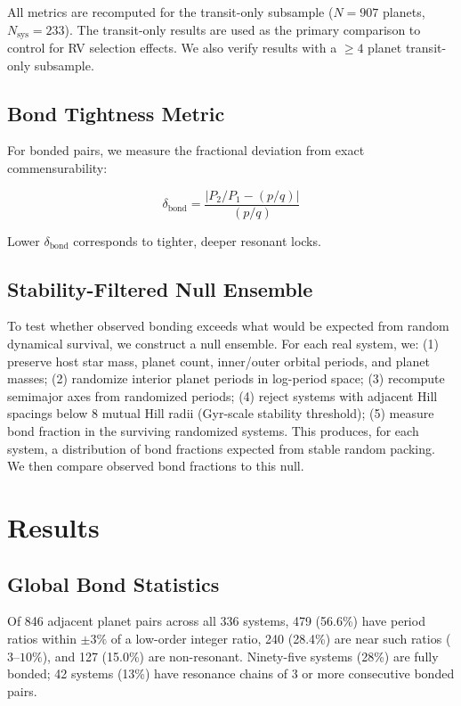 \documentclass[twocolumn]{aastex631}
\begin{document}
All metrics are recomputed for the transit-only subsample ($N=907$ planets,
$N_{\text{sys}}=233$). The transit-only results are used as the primary
comparison to control for RV selection effects. We also verify results with a
$\geq 4$ planet transit-only subsample.

\subsection{Bond Tightness Metric}

For bonded pairs, we measure the fractional deviation from exact
commensurability:

\begin{equation}
  \delta_{\text{bond}} = \frac{|P_2/P_1 - (p/q)|}{(p/q)}
\end{equation}

Lower $\delta_{\text{bond}}$ corresponds to tighter, deeper resonant locks.

\subsection{Stability-Filtered Null Ensemble}

To test whether observed bonding exceeds what would be expected from random
dynamical survival, we construct a null ensemble. For each real system, we:
(1) preserve host star mass, planet count, inner/outer orbital periods, and
planet masses; (2) randomize interior planet periods in log-period space;
(3) recompute semimajor axes from randomized periods; (4) reject systems with
adjacent Hill spacings below 8 mutual Hill radii (Gyr-scale stability
threshold); (5) measure bond fraction in the surviving randomized systems.
This produces, for each system, a distribution of bond fractions expected from
stable random packing. We then compare observed bond fractions to this null.

\section{Results}
\label{sec:results}

\subsection{Global Bond Statistics}

Of 846 adjacent planet pairs across all 336 systems, 479 (56.6\%) have period
ratios within $\pm 3\%$ of a low-order integer ratio, 240 (28.4\%) are near
such ratios ($3$--$10\%$), and 127 (15.0\%) are non-resonant. Ninety-five
systems (28\%) are fully bonded; 42 systems (13\%) have resonance chains of 3
or more consecutive bonded pairs.
\end{document}
